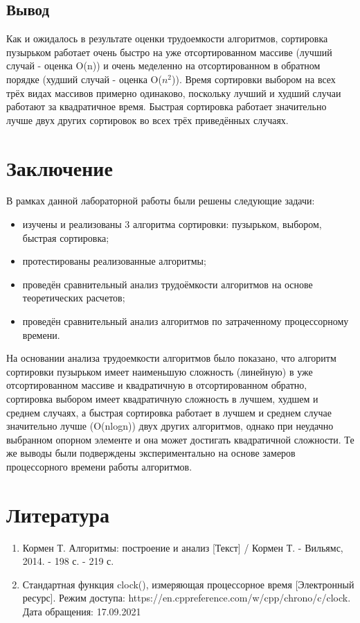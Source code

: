 \documentclass{report}
\begin{document}
\section{Вывод}

Как и ожидалось в результате оценки трудоемкости алгоритмов, сортировка пузырьком работает очень быстро на уже отсортированном массиве (лучший случай - оценка O(n)) и очень меделенно на отсортированном в обратном порядке (худший случай - оценка O($n^2$)). Время сортировки выбором на всех трёх видах массивов примерно одинаково, поскольку лучший и худший случаи работают за квадратичное время. Быстрая сортировка работает значительно лучше двух других сортировок во всех трёх приведённых случаях.


\chapter*{Заключение}

В рамках данной лабораторной работы были решены следующие задачи:

\begin{itemize}
	\item изучены и реализованы 3 алгоритма сортировки: пузырьком, выбором, быстрая сортировка;
	\item протестированы реализованные алгоритмы;
	\item проведён сравнительный анализ трудоёмкости алгоритмов на основе теоретических расчетов;
	\item проведён сравнительный анализ алгоритмов по затраченному процессорному времени.
\end{itemize}

На основании анализа трудоемкости алгоритмов было показано, что алгоритм сортировки пузырьком имеет наименьшую сложность (линейную) в уже отсортированном массиве и квадратичную в отсортированном обратно, сортировка выбором имеет квадратичную сложность в лучшем, худшем и среднем случаях, а быстрая сортировка работает в лучшем и среднем случае значительно лучше (O(nlogn)) двух других алгоритмов, однако при неудачно выбранном опорном элементе и она может достигать квадратичной сложности. Те же выводы были подверждены экспериментально на основе замеров процессорного времени работы алгоритмов. 

\chapter*{Литература}
\begin{enumerate}
	\item Кормен Т. Алгоритмы: построение и анализ [Текст] / Кормен Т. - Вильямс, 2014. - 198 с. - 219 с.
	\item Стандартная функция clock(), измеряющая процессорное время [Электронный ресурс]. Режим доступа: https://en.cppreference.com/w/cpp/chrono/c/clock. Дата обращения: 17.09.2021
\end{enumerate}
\end{document}
